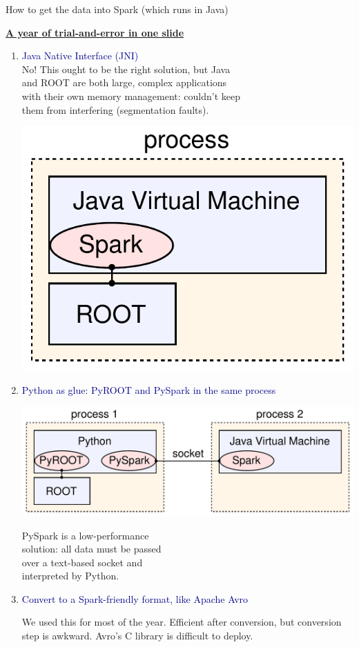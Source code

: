 \documentclass[aspectratio=169]{beamer}
\begin{document}
\begin{frame}{How to get the data into Spark (which runs in Java)}
\vspace{0.5 cm}
\small

\underline{\large \bf A year of trial-and-error in one slide}
\begin{center}
\begin{minipage}{0.8\linewidth}
\begin{enumerate}
\item \textcolor{darkblue}{Java Native Interface (JNI)} \\ No! This ought to be the right solution, but Java \\ and ROOT are both large, complex applications \\ with their own memory management: couldn't keep \\ them from interfering (segmentation faults).

\vspace{-2.2 cm}
\hfill \includegraphics[height=1.65 cm]{root-spark.pdf}

\vspace{0.5 cm}
\item \textcolor{darkblue}{\normalsize Python as glue: PyROOT and PySpark in the same process}

\hfill \includegraphics[height=1.65 cm]{pyroot-pyspark.pdf}

\vspace{-1.8 cm}
PySpark is a low-performance \\ solution: all data must be passed \\ over a text-based socket and \\ interpreted by Python.

\item \textcolor{darkblue}{\normalsize Convert to a Spark-friendly format, like Apache Avro}

We used this for most of the year. Efficient after conversion, but conversion step is awkward. Avro's C library is difficult to deploy.
\end{enumerate}
\end{minipage}
\end{center}


\end{frame}
\end{document}
